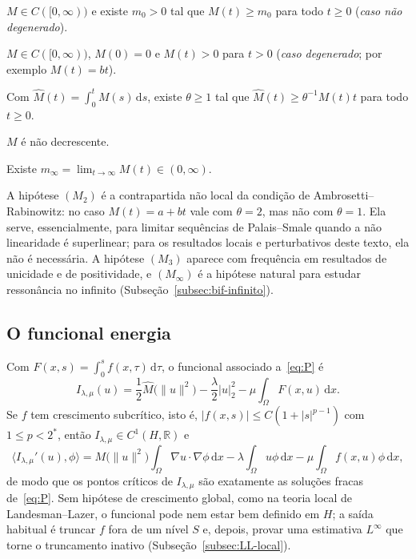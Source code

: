 \documentclass[11pt,a4paper]{article}
\theoremstyle{plain}
\theoremstyle{definition}
\theoremstyle{remark}
\newcommand{\R}{\mathbb{R}}
\newcommand{\norm}[1]{\lVert #1\rVert}
\newcommand{\abs}[1]{\lvert #1\rvert}
\newcommand{\Mh}{\widehat{M}}
\newcommand{\dx}{\,\mathrm{d}x}
\begin{document}
\begin{description}[leftmargin=2.6em,style=nextline]
\item[$(M_1)$] $M\in C([0,\infty))$ e existe $m_0>0$ tal que $M(t)\ge m_0$
para todo $t\ge0$ (\emph{caso não degenerado}).
\item[$(M_1')$] $M\in C([0,\infty))$, $M(0)=0$ e $M(t)>0$ para $t>0$
(\emph{caso degenerado}; por exemplo $M(t)=bt$).
\item[$(M_2)$] Com $\Mh(t)=\int_0^tM(s)\,\mathrm{d}s$, existe $\theta\ge1$ tal
que $\Mh(t)\ge\theta^{-1}M(t)t$ para todo $t\ge0$.
\item[$(M_3)$] $M$ é não decrescente.
\item[$(M_\infty)$] Existe $m_\infty=\lim_{t\to\infty}M(t)\in(0,\infty)$.
\end{description}

A hipótese $(M_2)$ é a contrapartida não local da condição de
Ambrosetti--Rabinowitz: no caso $M(t)=a+bt$ vale com $\theta=2$, mas não com
$\theta=1$. Ela serve, essencialmente, para limitar sequências de Palais--Smale
quando a não linearidade é superlinear; para os resultados locais e
perturbativos deste texto, ela não é necessária. A hipótese $(M_3)$ aparece com
frequência em resultados de unicidade e de positividade, e
$(M_\infty)$ é a hipótese natural para estudar ressonância no infinito
(Subseção~\ref{subsec:bif-infinito}).

\subsection{O funcional energia}

Com $F(x,s)=\int_0^sf(x,\tau)\,\mathrm{d}\tau$, o funcional associado
a~\eqref{eq:P} é
\begin{equation}\label{eq:funcional}
I_{\lambda,\mu}(u)=\frac12\Mh\bigl(\norm{u}^2\bigr)-\frac{\lambda}{2}\abs{u}_2^2-\mu\int_\Omega F(x,u)\dx .
\end{equation}
Se $f$ tem crescimento subcrítico, isto é,
$\abs{f(x,s)}\le C(1+\abs{s}^{p-1})$ com $1\le p<2^*$, então
$I_{\lambda,\mu}\in C^1(H,\R)$ e
\[
\langle I_{\lambda,\mu}'(u),\phi\rangle
=M\bigl(\norm{u}^2\bigr)\int_\Omega\nabla u\cdot\nabla\phi\dx
-\lambda\int_\Omega u\phi\dx-\mu\int_\Omega f(x,u)\phi\dx,
\]
de modo que os pontos críticos de $I_{\lambda,\mu}$ são exatamente as soluções
fracas de~\eqref{eq:P}. Sem hipótese de crescimento global, como na teoria local
de Landesman--Lazer, o funcional pode nem estar bem definido em $H$; a saída
habitual é truncar $f$ fora de um nível $S$ e, depois, provar uma estimativa
$L^\infty$ que torne o truncamento inativo
(Subseção~\ref{subsec:LL-local}).
\end{document}

